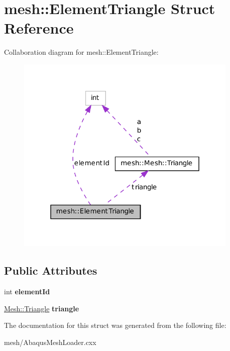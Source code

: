 \hypertarget{structmesh_1_1_element_triangle}{
\section{mesh::ElementTriangle Struct Reference}
\label{structmesh_1_1_element_triangle}
}


Collaboration diagram for mesh::ElementTriangle:\nopagebreak
\begin{figure}[H]
\begin{center}
\leavevmode
\includegraphics[width=301pt]{structmesh_1_1_element_triangle__coll__graph}
\end{center}
\end{figure}
\subsection*{Public Attributes}
\begin{DoxyCompactItemize}
\item 
\hypertarget{structmesh_1_1_element_triangle_aed9632916db442aea0edf3a1da8a1fad}{
int {\bfseries elementId}}
\label{structmesh_1_1_element_triangle_aed9632916db442aea0edf3a1da8a1fad}

\item 
\hypertarget{structmesh_1_1_element_triangle_a9b8df40432def8b3b715e01f8706df0e}{
\hyperlink{structmesh_1_1_mesh_1_1_triangle}{Mesh::Triangle} {\bfseries triangle}}
\label{structmesh_1_1_element_triangle_a9b8df40432def8b3b715e01f8706df0e}

\end{DoxyCompactItemize}


The documentation for this struct was generated from the following file:\begin{DoxyCompactItemize}
\item 
mesh/AbaqusMeshLoader.cxx\end{DoxyCompactItemize}
